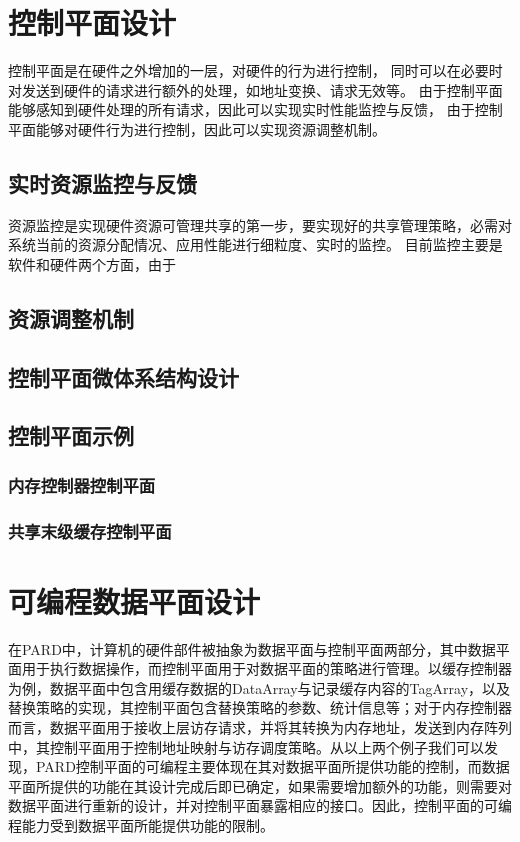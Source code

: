 \section{控制平面设计}

控制平面是在硬件之外增加的一层，对硬件的行为进行控制，
同时可以在必要时对发送到硬件的请求进行额外的处理，如地址变换、请求无效等。
由于控制平面能够感知到硬件处理的所有请求，因此可以实现实时性能监控与反馈，
由于控制平面能够对硬件行为进行控制，因此可以实现资源调整机制。

\subsection{实时资源监控与反馈}
资源监控是实现硬件资源可管理共享的第一步，要实现好的共享管理策略，必需对系统当前的资源分配情况、应用性能进行细粒度、实时的监控。
目前监控主要是软件和硬件两个方面，由于


\subsection{资源调整机制}

\subsection{控制平面微体系结构设计}

\subsection{控制平面示例}

\subsubsection{内存控制器控制平面}

\subsubsection{共享末级缓存控制平面}


\section{可编程数据平面设计}

在PARD中，计算机的硬件部件被抽象为数据平面与控制平面两部分，其中数据平面用于执行数据操作，而控制平面用于对数据平面的策略进行管理。以缓存控制器为例，数据平面中包含用缓存数据的DataArray与记录缓存内容的TagArray，以及替换策略的实现，其控制平面包含替换策略的参数、统计信息等；对于内存控制器而言，数据平面用于接收上层访存请求，并将其转换为内存地址，发送到内存阵列中，其控制平面用于控制地址映射与访存调度策略。从以上两个例子我们可以发现，PARD控制平面的可编程主要体现在其对数据平面所提供功能的控制，而数据平面所提供的功能在其设计完成后即已确定，如果需要增加额外的功能，则需要对数据平面进行重新的设计，并对控制平面暴露相应的接口。因此，控制平面的可编程能力受到数据平面所能提供功能的限制。

